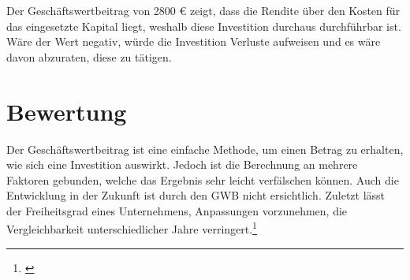 Der Geschäftswertbeitrag von 2800 € zeigt, dass die Rendite über den Kosten für das eingesetzte Kapital liegt, weshalb diese Investition durchaus durchführbar ist. Wäre der Wert negativ, würde die Investition Verluste aufweisen und es wäre davon abzuraten, diese zu tätigen.

\section{Bewertung}

Der Geschäftswertbeitrag ist eine einfache Methode, um einen Betrag zu erhalten, wie sich eine Investition auswirkt. Jedoch ist die Berechnung an mehrere Faktoren gebunden, welche das Ergebnis sehr leicht verfälschen können. Auch die Entwicklung in der Zukunft ist durch den GWB nicht ersichtlich. Zuletzt lässt der Freiheitsgrad eines Unternehmens, Anpassungen vorzunehmen, die Vergleichbarkeit unterschiedlicher Jahre verringert.\footnote{\cite{controlling-eva}}
